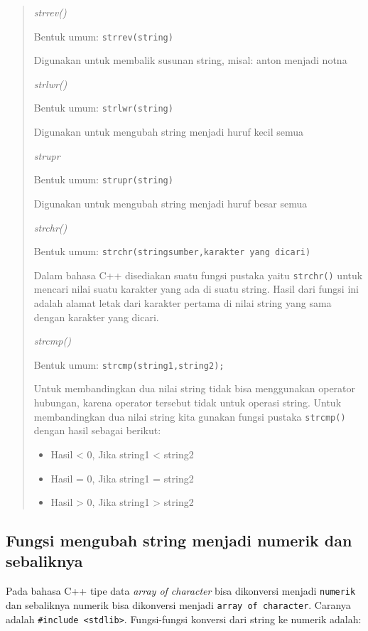 {{\begin{quotation}
\emph{strrev()}

Bentuk umum: \texttt{strrev(string)}

Digunakan untuk membalik susunan string, misal: anton menjadi notna

\emph{strlwr()}

Bentuk umum: \texttt{strlwr(string)}

Digunakan untuk mengubah string menjadi huruf kecil semua

\emph{strupr}

Bentuk umum: \texttt{strupr(string)}

Digunakan untuk mengubah string menjadi huruf besar semua

\emph{strchr()}

Bentuk umum: \texttt{strchr(stringsumber,karakter\ yang\ dicari)}

Dalam bahasa C++ disediakan suatu fungsi pustaka yaitu \texttt{strchr()}
untuk mencari nilai suatu karakter yang ada di suatu string. Hasil dari
fungsi ini adalah alamat letak dari karakter pertama di nilai string
yang sama dengan karakter yang dicari.

\emph{strcmp()}

Bentuk umum: \texttt{strcmp(string1,string2);}

Untuk membandingkan dua nilai string tidak bisa menggunakan operator
hubungan, karena operator tersebut tidak untuk operasi string. Untuk
membandingkan dua nilai string kita gunakan fungsi pustaka
\texttt{strcmp()} dengan hasil sebagai berikut:

\begin{itemize}

\item
Hasil \textless{} 0, Jika string1 \textless{} string2
\item
Hasil = 0, Jika string1 = string2
\item
Hasil \textgreater{} 0, Jika string1 \textgreater{} string2
\end{itemize}
\end{quotation}


\subsection{Fungsi mengubah string menjadi numerik dan sebaliknya}\label{fungsi-mengubah-string-menjadi-numerik-dan-sebaliknya}

Pada bahasa C++ tipe data \emph{array of character} bisa dikonversi
menjadi \texttt{numerik} dan sebaliknya numerik bisa dikonversi menjadi
\texttt{array\ of\ character}. Caranya adalah
\texttt{\#include\ \textless{}stdlib\textgreater{}}. Fungsi-fungsi
konversi dari string ke numerik adalah:

}}
